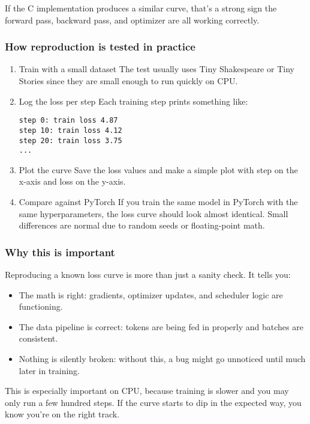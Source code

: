 \documentclass[
  letterpaper,
  DIV=11,
  numbers=noendperiod]{scrreprt}
\providecommand{\tightlist}{%
  \setlength{\itemsep}{0pt}\setlength{\parskip}{0pt}}
\begin{document}
If the C implementation produces a similar curve, that's a strong sign
the forward pass, backward pass, and optimizer are all working
correctly.

\subsubsection{How reproduction is tested in
practice}\label{how-reproduction-is-tested-in-practice}

\begin{enumerate}
\def\labelenumi{\arabic{enumi}.}
\item
  Train with a small dataset The test usually uses Tiny Shakespeare or
  Tiny Stories since they are small enough to run quickly on CPU.
\item
  Log the loss per step Each training step prints something like:

\begin{verbatim}
step 0: train loss 4.87
step 10: train loss 4.12
step 20: train loss 3.75
...
\end{verbatim}
\item
  Plot the curve Save the loss values and make a simple plot with step
  on the x-axis and loss on the y-axis.
\item
  Compare against PyTorch If you train the same model in PyTorch with
  the same hyperparameters, the loss curve should look almost identical.
  Small differences are normal due to random seeds or floating-point
  math.
\end{enumerate}

\subsubsection{Why this is important}\label{why-this-is-important}

Reproducing a known loss curve is more than just a sanity check. It
tells you:

\begin{itemize}
\tightlist
\item
  The math is right: gradients, optimizer updates, and scheduler logic
  are functioning.
\item
  The data pipeline is correct: tokens are being fed in properly and
  batches are consistent.
\item
  Nothing is silently broken: without this, a bug might go unnoticed
  until much later in training.
\end{itemize}

This is especially important on CPU, because training is slower and you
may only run a few hundred steps. If the curve starts to dip in the
expected way, you know you're on the right track.
\end{document}
